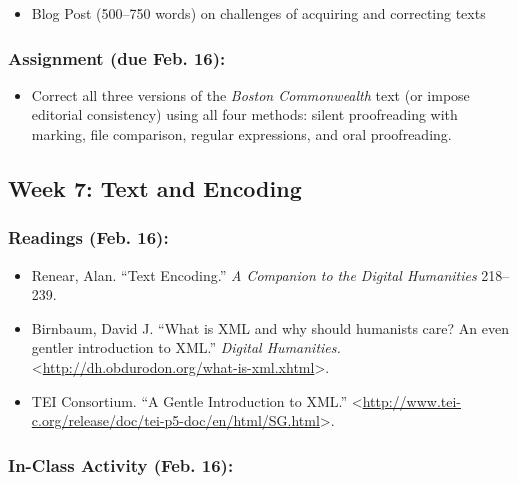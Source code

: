 \documentclass[]{article}
\begin{document}
\begin{itemize}
\itemsep1pt\parskip0pt
\item
  Blog Post (500--750 words) on challenges of acquiring and correcting
  texts
\end{itemize}

\subsubsection{Assignment (due Feb. 16):}\label{assignment-due-feb.-16}

\begin{itemize}
\itemsep1pt\parskip0pt
\item
  Correct all three versions of the \emph{Boston Commonwealth} text (or
  impose editorial consistency) using all four methods: silent
  proofreading with marking, file comparison, regular expressions, and
  oral proofreading.
\end{itemize}

\subsection{Week 7: Text and Encoding}\label{week-7-text-and-encoding}

\subsubsection{Readings (Feb. 16):}\label{readings-feb.-16}

\begin{itemize}
\itemsep1pt\parskip0pt
\item
  Renear, Alan. ``Text Encoding.'' \emph{A Companion to the Digital
  Humanities} 218--239.
\item
  Birnbaum, David J. ``What is XML and why should humanists care? An
  even gentler introduction to XML.'' \emph{Digital Humanities.}
  \textless{}\url{http://dh.obdurodon.org/what-is-xml.xhtml}\textgreater{}.
\item
  TEI Consortium. ``A Gentle Introduction to XML.''
  \textless{}\url{http://www.tei-c.org/release/doc/tei-p5-doc/en/html/SG.html}\textgreater{}.
\end{itemize}

\subsubsection{In-Class Activity (Feb.
16):}\label{in-class-activity-feb.-16}
\end{document}
